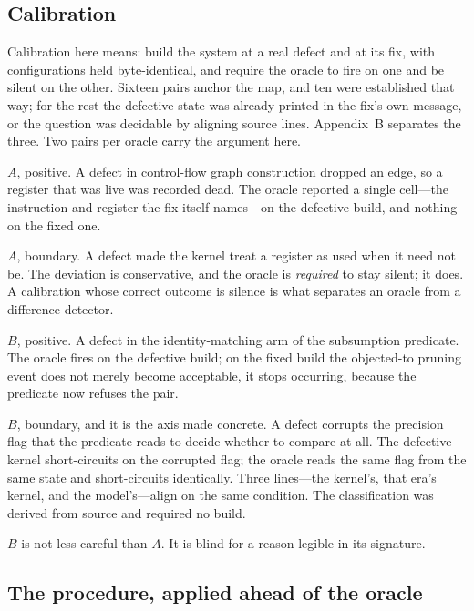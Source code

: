 \subsection{Calibration}

Calibration here means: build the system at a real defect and at its fix, with
configurations held byte-identical, and require the oracle to fire on one and be
silent on the other. Sixteen pairs anchor the map, and ten were established that
way; for the rest the defective state was already printed in the fix's own message,
or the question was decidable by aligning source lines. Appendix~B separates the
three. Two pairs per oracle carry the argument here.

$A$, positive. A defect in control-flow graph construction dropped an edge, so a
register that was live was recorded dead. The oracle reported a single cell---the
instruction and register the fix itself names---on the defective build, and nothing
on the fixed one.

$A$, boundary. A defect made the kernel treat a register as used when it need not
be. The deviation is conservative, and the oracle is \emph{required} to stay silent;
it does. A calibration whose correct outcome is silence is what separates an oracle
from a difference detector.

$B$, positive. A defect in the identity-matching arm of the subsumption predicate.
The oracle fires on the defective build; on the fixed build the objected-to pruning
event does not merely become acceptable, it stops occurring, because the predicate
now refuses the pair.

$B$, boundary, and it is the axis made concrete. A defect corrupts the precision
flag that the predicate reads to decide whether to compare at all. The defective
kernel short-circuits on the corrupted flag; the oracle reads the same flag from the
same state and short-circuits identically. Three lines---the kernel's, that era's
kernel, and the model's---align on the same condition. The classification was
derived from source and required no build.

$B$ is not less careful than $A$. It is blind for a reason legible in its signature.

\subsection{The procedure, applied ahead of the oracle}

